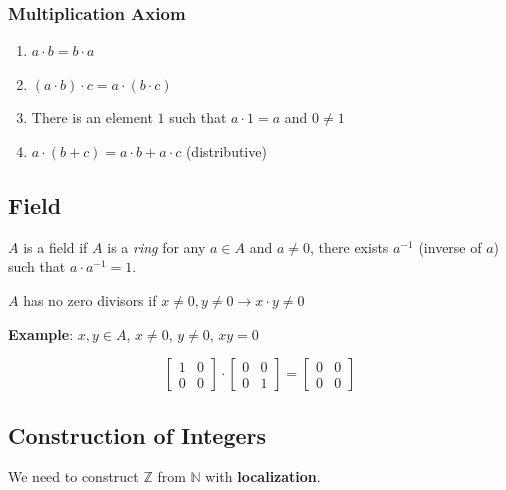 \documentclass{article}
\begin{document}
    \subsubsection{Multiplication Axiom}
    
    \begin{enumerate}
        \item $a \cdot b = b \cdot a$
        \item $(a \cdot b) \cdot c = a \cdot (b \cdot c)$
        \item There is an element $1$ such that $a \cdot 1 = a$ and $0 \neq 1$
        \item $a \cdot (b + c) = a \cdot b + a \cdot c$ (distributive)
    \end{enumerate}

    \subsection{Field}
    
    $A$ is a field if $A$ is a \textit{ring} for any $a \in A$ and $a \neq 0$, there exists $a^{-1}$ (inverse of $a$) such that $a \cdot a^{-1} = 1$.
    
    $A$ has no zero divisors if $x \neq 0, y \neq 0 \rightarrow x \cdot y \neq 0$
    
    \textbf{Example}: $x, y \in A$, $x \neq 0$, $y \neq 0$, $xy = 0$
    
    \begin{displaymath}
    \begin{bmatrix}
        1 & 0 \\
        0 & 0
    \end{bmatrix}
    \cdot
    \begin{bmatrix}
        0 & 0 \\
        0 & 1
    \end{bmatrix}
    =
    \begin{bmatrix}
        0 & 0 \\
        0 & 0
    \end{bmatrix}
    \end{displaymath}
    
    \subsection{Construction of Integers}
    
    We need to construct $\mathbb{Z}$ from $\mathbb{N}$ with \textbf{localization}.
    
\end{document}
